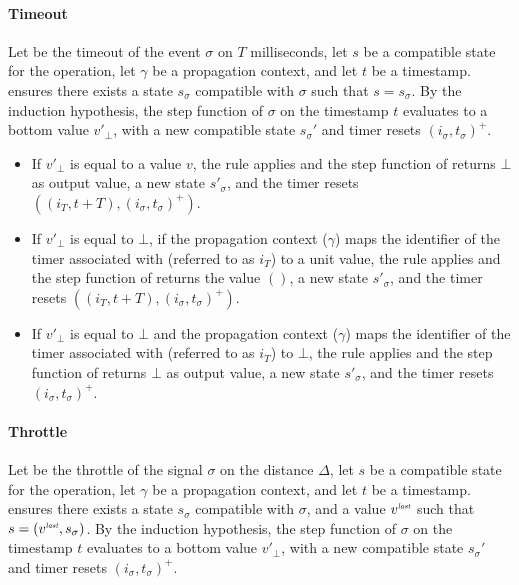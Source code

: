 \begin{skippableproof}
    \paragraph{Timeout}
    Let  be the timeout of the event $\sigma$ on $T$ milliseconds, let $s$ be a
    compatible state for the operation, let $\gamma$ be a propagation context, and let $t$ be a
    timestamp.
     ensures there exists a state $s_\sigma$
    compatible with $\sigma$ such that $s = s_\sigma$.
    By the induction hypothesis, the step function of $\sigma$ on the timestamp $t$ evaluates to a
    bottom value $v'_\bot$, with a new compatible state $s_\sigma'$ and timer resets $(i_\sigma,
        t_\sigma)^+$.

    \begin{itemize}
        \item If $v'_\bot$ is equal to a value $v$, the rule  applies and the step function of 
              returns $\bot$ as output value, a new state $s'_\sigma$, and the timer resets
              $((i_T, t + T), (i_\sigma, t_\sigma)^+)$.

        \item If $v'_\bot$ is equal to $\bot$, if the propagation context ($\gamma$) maps the
              identifier of the timer associated with  (referred to as $i_T$) to a
              unit value, the rule  applies and
              the step function of  returns the value $()$, a new state
              $s'_\sigma$, and the timer resets $((i_T, t + T), (i_\sigma, t_\sigma)^+)$.

        \item If $v'_\bot$ is equal to $\bot$ and the propagation context ($\gamma$) maps the
              identifier of the timer associated with  (referred to as $i_T$) to
              $\bot$, the rule  applies and
              the step function of  returns $\bot$ as output value, a new state
              $s'_\sigma$, and the timer resets $(i_\sigma, t_\sigma)^+$.
    \end{itemize}

    \paragraph{Throttle}
    Let \throttle{\sigma}{\Delta} be the throttle of the signal $\sigma$ on the distance $\Delta$,
    let $s$ be a compatible state for the operation, let $\gamma$ be a propagation context, and let
    $t$ be a timestamp.
     ensures there exists a state $s_\sigma$
    compatible with $\sigma$, and a value $v^{\textit{\tiny last}}$ such that $s = (v^{\textit{\tiny last}}, s_\sigma)$.
    By the induction hypothesis, the step function of $\sigma$ on the timestamp $t$ evaluates to a
    bottom value $v'_\bot$, with a new compatible state $s_\sigma'$ and timer resets $(i_\sigma,
        t_\sigma)^+$.


\end{skippableproof}
